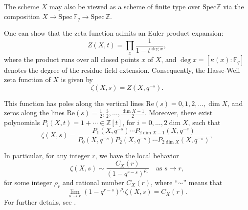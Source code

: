 \documentclass[12pt]{amsart}
\begin{document}
The scheme $X$ may also be viewed as a scheme of finite type over $\mathrm{Spec} \mathbb{Z}$ via the composition $
X \to \mathrm{Spec}\,\mathbb{F}_q \to \mathrm{Spec}\,\mathbb{Z}.$


One can show that the zeta function admits an Euler product expansion:
\[
Z(X, t) = \prod_{x} \frac{1}{1 - t^{\deg x}},
\]
where the product runs over all closed points $x$ of $X$, and $\deg x = [\kappa(x) : \mathbb{F}_q]$ denotes the degree of the residue field extension. Consequently, the {Hasse-Weil zeta function} of $X$ is given by
\[
\zeta(X, s) = Z(X, q^{-s}).
\]


This function has poles along the vertical lines $\mathrm{Re}(s) = 0, 1, 2, \ldots, \dim X$, and zeros along the lines $\mathrm{Re}(s) = \frac{1}{2}, \frac{3}{2}, \ldots, \frac{\dim X - 1}{2}$. Moreover, there exist polynomials $P_i(X, t) = 1 + \cdots \in \mathbb{Z}[t]$, for $i = 0, \ldots, 2\dim X$, such that
\[
\zeta(X, s) = \frac{P_1(X, q^{-s}) \cdots P_{2\dim X-1}(X, q^{-s})}{P_0(X, q^{-s}) P_2(X, q^{-s}) \cdots P_{2\dim X}(X, q^{-s})},
\]


 In particular, for any integer $r$, we have the local behavior
\begin{equation}\label{near0}
\zeta(X, s) \sim \frac{C_X(r)}{(1 - q^{r-s})^{\rho_r}} \quad \text{as } s \to r,
\end{equation}
for some integer $\rho_r$ and rational number $C_X(r)$, where ``$\sim$'' means that
\[
\lim_{s \to r} (1 - q^{r-s})^{\rho_r} \zeta(X, s) = C_X(r).
\]
For further details, see \cite{DixExposes, Milne1, Tate-zeta1, Tate-abelian, Tate-zeta2, Schneider-zeta}.
\end{document}

